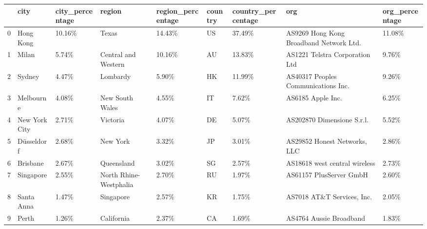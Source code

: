 \begin{tabular}{rllllllll}
\toprule
    & city          & city\_percentage   & region                 & region\_percentage   & country   & country\_percentage   & org                                     & org\_percentage   \\
\midrule
  0 & Hong Kong     & 10.16\%            & Texas                  & 14.43\%              & US        & 37.49\%               & AS9269 Hong Kong Broadband Network Ltd. & 11.08\%           \\
  1 & Milan         & 5.74\%             & Central and Western    & 10.16\%              & AU        & 13.83\%               & AS1221 Telstra Corporation Ltd          & 9.76\%            \\
  2 & Sydney        & 4.47\%             & Lombardy               & 5.90\%               & HK        & 11.99\%               & AS40317 Peoples Communications Inc.     & 9.26\%            \\
  3 & Melbourne     & 4.08\%             & New South Wales        & 4.55\%               & IT        & 7.62\%                & AS6185 Apple Inc.                       & 6.25\%            \\
  4 & New York City & 2.71\%             & Victoria               & 4.07\%               & DE        & 5.07\%                & AS202870 Dimensione S.r.l.              & 5.52\%            \\
  5 & Düsseldorf    & 2.68\%             & New York               & 3.32\%               & JP        & 3.01\%                & AS29852 Honest Networks, LLC            & 2.86\%            \\
  6 & Brisbane      & 2.67\%             & Queensland             & 3.02\%               & SG        & 2.57\%                & AS18618 west central wireless           & 2.73\%            \\
  7 & Singapore     & 2.55\%             & North Rhine-Westphalia & 2.70\%               & RU        & 1.97\%                & AS61157 PlusServer GmbH                 & 2.60\%            \\
  8 & Santa Anna    & 1.47\%             & Singapore              & 2.57\%               & KR        & 1.75\%                & AS7018 AT\&T Services, Inc.              & 2.05\%            \\
  9 & Perth         & 1.26\%             & California             & 2.37\%               & CA        & 1.69\%                & AS4764 Aussie Broadband                 & 1.83\%            \\
\bottomrule
\end{tabular}